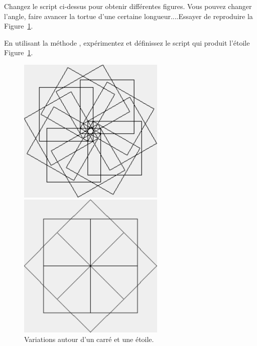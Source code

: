
 Changez le script ci-dessus pour obtenir diff\'erentes 
figures. Vous pouvez changer l'angle, faire avancer la tortue d'une
certaine longueur....Essayer de reproduire la Figure~\ref{c7star}.





 En utilisant la m\'ethode , 
exp\'erimentez et d\'efinissez le script qui produit l'\'etoile
Figure~\ref{c7star}.


\begin{figure}[!htbp]
\begin{minipage}[c]{.4\linewidth}
\centerline{\includegraphics[width=7cm]{c7carrevar1}}
\end{minipage}
\hfill
\begin{minipage}[c]{.4\linewidth}
\centerline{\includegraphics[width=7cm]{c7star}}
\end{minipage}
\caption{Variations autour d'un carr\'e et une \'etoile.}
\label{c7star}
\end{figure}

